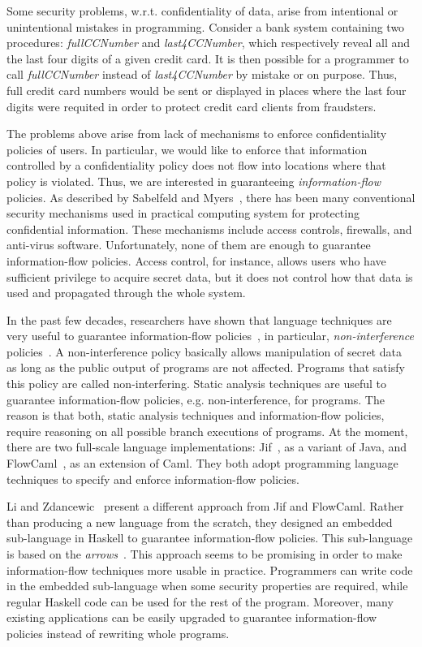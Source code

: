 \documentclass{report}
\begin{document}
Some security problems, w.r.t. confidentiality of data,
arise from intentional or unintentional mistakes in programming.
Consider a bank system containing two procedures:
 \emph{fullCCNumber} and \emph{last4CCNumber}, which respectively reveal 
all and the last four digits of a given credit card. It is then
possible for a programmer to call \emph{fullCCNumber} instead of 
\emph{last4CCNumber} by mistake or on purpose. Thus, full credit card numbers would be 
sent or displayed in places where the last four digits were 
requited in order to protect credit card clients from fraudsters.

The problems above arise from lack of mechanisms to enforce
confidentiality policies of users. In particular, we would like to
enforce that information controlled by a confidentiality policy does 
not flow into locations where that policy is violated. Thus, we are 
interested in guaranteeing \emph{information-flow}
policies. As described by Sabelfeld and Myers~\cite{Sabelfeld:Myers:JSAC},
there has been many conventional security mechanisms used in practical 
computing system for protecting confidential information. These
mechanisms include access controls, 
firewalls, and anti-virus software. Unfortunately, none of them  
are enough to guarantee information-flow policies. 
Access control, for instance, allows users who have sufficient 
privilege to acquire secret data, but it does not control how that data is 
used and propagated through the whole system. 

In the past few decades, researchers have shown that language
techniques are 
very useful to guarantee information-flow policies~\cite{Sabelfeld:Myers:JSAC}, in
particular, \emph{non-interference} policies~\cite{Goguen:Meseguer:Noninterference}. 
A non-interference policy basically allows manipulation of secret data 
as long as the public output of programs are not affected. 
Programs that satisfy this policy are called non-interfering. 
Static analysis techniques are useful to guarantee information-flow
policies, e.g. non-interference, for programs. The reason
is that both, static analysis techniques and information-flow 
policies, require reasoning on all possible branch executions of
programs.  At the moment, there are two full-scale language
implementations: Jif~\cite{jif}, as a variant of Java, and
FlowCaml~\cite{FlowCaml}, as an extension of Caml. They both adopt
programming language techniques to specify and enforce 
information-flow policies.

Li and Zdancewic~\cite{Li:Zdancewic:CSFW} present a different
approach from Jif and FlowCaml. 
Rather than producing a new language from the scratch, 
they designed an embedded sub-language in Haskell to 
guarantee information-flow policies. This sub-language is based on the
{\em arrows}~\cite{Hughes:SCP00}. This approach seems to be promising 
in order to make information-flow techniques more usable in practice.
Programmers can write code in the 
embedded sub-language when some security properties are required,  
while regular Haskell code can be used for the rest of the program.
Moreover, many existing applications can be easily upgraded
to guarantee information-flow policies instead of 
rewriting whole programs.
\end{document}
